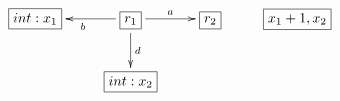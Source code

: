 $\xymatrix{
   \fbox{$int:x_1$} & \fbox{$r_1$} \ar[l]^{b} \ar[d]^{d} \ar[r]^{a} & \fbox{$r_2$} & \fbox{$x_1+1, x_2$} \\
   & \fbox{$int:x_2$}
}$
